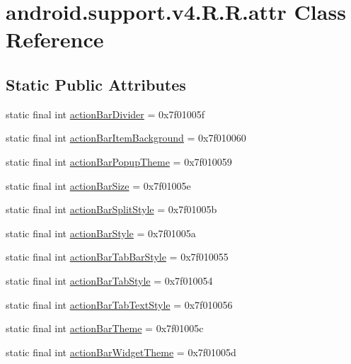 \hypertarget{classandroid_1_1support_1_1v4_1_1_r_1_1attr}{
\section{android.support.v4.R.R.attr Class Reference}
\label{classandroid_1_1support_1_1v4_1_1_r_1_1attr}
}
\subsection*{Static Public Attributes}
\begin{CompactItemize}
\item 
static final int \hyperlink{classandroid_1_1support_1_1v4_1_1_r_1_1attr_8c4acfa0a2d20f2f77ebfb6ca55f2066}{actionBarDivider} = 0x7f01005f
\item 
static final int \hyperlink{classandroid_1_1support_1_1v4_1_1_r_1_1attr_57fb7f4a4554800c2dcfcdc8810cda10}{actionBarItemBackground} = 0x7f010060
\item 
static final int \hyperlink{classandroid_1_1support_1_1v4_1_1_r_1_1attr_d1a7c78acd6104a2629ba0661674d640}{actionBarPopupTheme} = 0x7f010059
\item 
static final int \hyperlink{classandroid_1_1support_1_1v4_1_1_r_1_1attr_0f05b281b0b7a614e6188c5abf1ce8b9}{actionBarSize} = 0x7f01005e
\item 
static final int \hyperlink{classandroid_1_1support_1_1v4_1_1_r_1_1attr_c33fdae86b8b0a9a82a7558704fb242b}{actionBarSplitStyle} = 0x7f01005b
\item 
static final int \hyperlink{classandroid_1_1support_1_1v4_1_1_r_1_1attr_6094ba3cd122fc85c532aa6f8c2b265b}{actionBarStyle} = 0x7f01005a
\item 
static final int \hyperlink{classandroid_1_1support_1_1v4_1_1_r_1_1attr_9dffa8628ed0688f9760abfcc77549c2}{actionBarTabBarStyle} = 0x7f010055
\item 
static final int \hyperlink{classandroid_1_1support_1_1v4_1_1_r_1_1attr_313897c0fbe257860ddbda81f27f15d8}{actionBarTabStyle} = 0x7f010054
\item 
static final int \hyperlink{classandroid_1_1support_1_1v4_1_1_r_1_1attr_a8d424009234d0c33008bfdb86a3493d}{actionBarTabTextStyle} = 0x7f010056
\item 
static final int \hyperlink{classandroid_1_1support_1_1v4_1_1_r_1_1attr_3ee4a8e4d249985f8f0a531633caac6f}{actionBarTheme} = 0x7f01005c
\item 
static final int \hyperlink{classandroid_1_1support_1_1v4_1_1_r_1_1attr_b413037ffd60c4fee103ea1e597401b4}{actionBarWidgetTheme} = 0x7f01005d

\end{CompactItemize}

